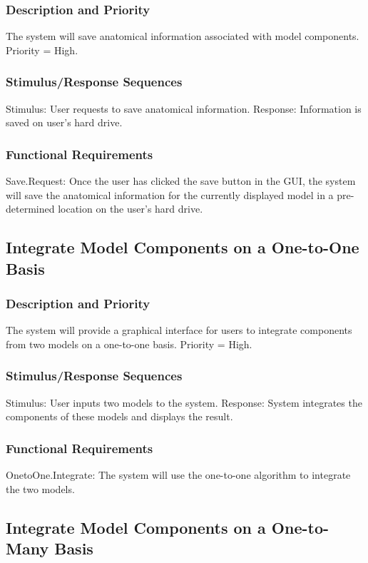 \documentclass{article}
\begin{document}
\subsubsection{Description and Priority}
The system will save anatomical information associated with model components.  Priority = High.

\subsubsection{Stimulus/Response Sequences}

Stimulus: User requests to save anatomical information.
Response: Information is saved on user's hard drive.

\subsubsection{Functional Requirements}
Save.Request: Once the user has clicked the save button in the GUI, the system will save the anatomical information for the currently displayed model in a pre-determined location on the user's hard drive.


\subsection{Integrate Model Components on a One-to-One Basis}

\subsubsection{Description and Priority}
The system will provide a graphical interface for users to integrate components from two models on a one-to-one basis.  Priority = High.

\subsubsection{Stimulus/Response Sequences}
Stimulus: User inputs two models to the system.
Response: System integrates the components of these models and displays the result.

\subsubsection{Functional Requirements}
OnetoOne.Integrate: The system will use the one-to-one algorithm to integrate the two models.

\subsection{Integrate Model Components on a One-to-Many Basis}
\end{document}
